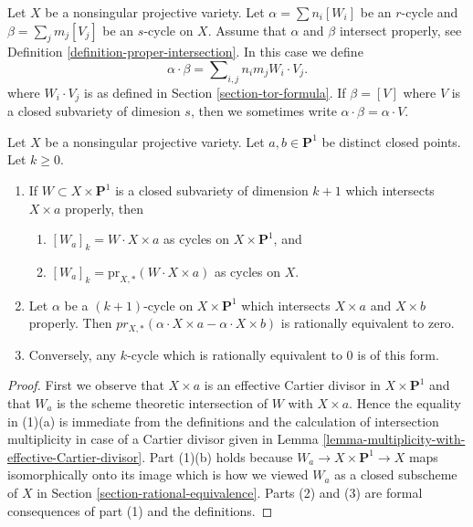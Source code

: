 \noindent
Let $X$ be a nonsingular projective variety. Let
$\alpha = \sum n_i [W_i]$ be an $r$-cycle and
$\beta = \sum_j m_j [V_j]$ be an $s$-cycle on $X$.
Assume that $\alpha$ and $\beta$ intersect properly, see
Definition \ref{definition-proper-intersection}.
In this case we define
$$
\alpha \cdot \beta = \sum\nolimits_{i,j} n_i m_j W_i \cdot V_j.
$$
where $W_i \cdot V_j$ is as defined in Section \ref{section-tor-formula}.
If $\beta = [V]$ where $V$ is a closed subvariety of dimesion $s$,
then we sometimes write $\alpha \cdot \beta = \alpha \cdot V$.

\begin{lemma}
\label{lemma-rational-equivalence-and-intersection}
Let $X$ be a nonsingular projective variety. Let $a, b \in \mathbf{P}^1$
be distinct closed points. Let $k \geq 0$.
\begin{enumerate}
\item If $W \subset X \times \mathbf{P}^1$ is a closed subvariety
of dimension $k + 1$ which intersects $X \times a$ properly, then
\begin{enumerate}
\item $[W_a]_k = W \cdot X \times a$ as cycles on $X \times \mathbf{P}^1$, and
\item $[W_a]_k = \text{pr}_{X, *}(W \cdot X \times a)$ as cycles on $X$.
\end{enumerate}
\item Let $\alpha$ be a $(k + 1)$-cycle on $X \times \mathbf{P}^1$
which intersects $X \times a$ and $X \times b$ properly. Then
$pr_{X,*}( \alpha \cdot X \times a - \alpha \cdot X \times b)$
is rationally equivalent to zero.
\item Conversely, any $k$-cycle which is
rationally equivalent to $0$ is of this form.
\end{enumerate}
\end{lemma}

\begin{proof}
First we observe that $X \times a$ is an effective Cartier divisor in
$X \times \mathbf{P}^1$ and that $W_a$ is the scheme theoretic intersection
of $W$ with $X \times a$. Hence the equality in (1)(a) is
immediate from the definitions and the calculation of intersection
multiplicity in case of a Cartier divisor given in
Lemma \ref{lemma-multiplicity-with-effective-Cartier-divisor}.
Part (1)(b) holds because $W_a \to X \times \mathbf{P}^1 \to X$ maps
isomorphically onto its image which is how we viewed $W_a$
as a closed subscheme of $X$ in Section \ref{section-rational-equivalence}.
Parts (2) and (3) are formal consequences of part (1) and the definitions.
\end{proof}

